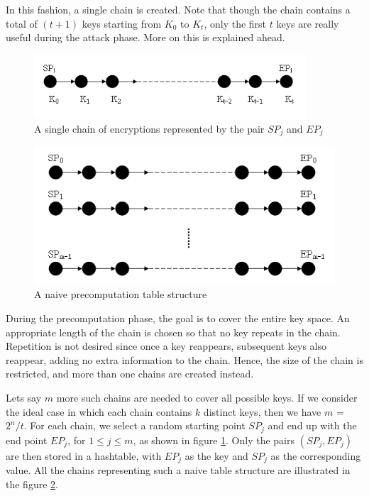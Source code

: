 In this fashion, a single chain is created. Note that though the chain contains a total of $(t+1)$ keys starting from $K_0$ to $K_{t}$, only the first $t$ keys are really useful during the attack phase. More on this is explained ahead. 

\begin{figure}[ht!]
	\centering
		\includegraphics[width=4in]{./figures/single-chain.PNG}
	\caption{A single chain of encryptions represented by the pair $SP_j$ and $EP_j$}	
	\label{fig:single-chain}
\end{figure}

\begin{figure}[ht!]
	\centering
		\includegraphics[width=4.5in]{./figures/naive-hellman-table.PNG}
	\caption{A naive precomputation table structure}	
	\label{fig:naive-hellman-table}
\end{figure}

During the precomputation phase, the goal is to cover the entire key space. An appropriate length of the chain is chosen so that no key repeats in the chain. Repetition is not desired since once a key reappears, subsequent keys also reappear, adding no extra information to the chain. Hence, the size of the chain is restricted, and more than one chains are created instead. 

Lets say $m$ more such chains are needed to cover all possible keys. If we consider the ideal case in which each chain contains $k$ distinct keys, then we have $m$ = $2^n/t$. For each chain, we select a random starting point $SP_j$ and end up with the end point $EP_j$, for $1 \leq j \leq m$, as shown in figure \ref{fig:single-chain}. Only the pairs $(SP_j,EP_j)$ are then stored in a hashtable, with $EP_j$ as the key and $SP_j$ as the corresponding value. All the chains representing such a naive table structure are illustrated in the figure \ref{fig:naive-hellman-table}.

